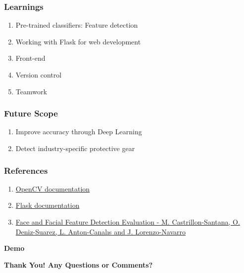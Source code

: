 \documentclass[14pt]{beamer}
\begin{document}
\begin{frame}
    \frametitle{Learnings}
    \begin{enumerate}
        \item Pre-trained classifiers: Feature detection
        \item Working with Flask for web development
        \item Front-end
        \item Version control  
        \item Teamwork
    \end{enumerate}
\end{frame}

\begin{frame}
    \frametitle{Future Scope}
    \begin{enumerate}
        \item Improve accuracy through Deep Learning
        \item Detect industry-specific protective gear
    \end{enumerate}
\end{frame}


\begin{frame}
    \frametitle{References}
    \begin{enumerate}
        \item \href{https://opencv.org/}{OpenCV documentation} 
        \item \href{https://flask.palletsprojects.com/en/1.1.x/}{Flask documentation} 
        \item \href{http://alereimondo.no-ip.org/OpenCV/uploads/37/CameraReadyPaper63.pdf}{Face and Facial Feature Detection Evaluation  \newline - M. Castrillon-Santana, O. Deniz-Suarez, L. Anton-Canalıs and J. Lorenzo-Navarro}
    \end{enumerate}
\end{frame}

\begin{frame}[c]{ }
    \centering
\huge \textbf{Demo}
\end{frame}

\begin{frame}[c]{ }
    \centerline \normalsize \textbf{Thank You! \newline Any Questions or Comments?} 
\end{frame}
\end{document}
